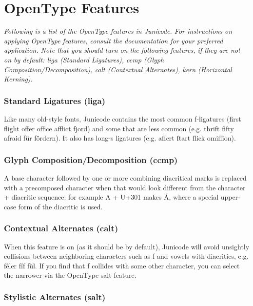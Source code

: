 \documentclass[12pt,a4paper,openany]{book}
\newcommand{\saltb}[1]{{\addfontfeatures{Alternate=1}{#1}}}
\begin{document}
\chapter*{\color{myBlue}OpenType Features}

{\itshape Following is a list of the OpenType features in
  Junicode. For instructions on applying OpenType features, consult
  the documentation for your preferred application. Note that you
  should turn on the following features, if they are not on by
  default: {\upshape liga} (Standard Ligatures), {\upshape ccmp}
  (Glyph Composition/Decomposition), {\upshape calt} (Contextual
  Alternates), {\upshape kern} (Horizontal Kerning).}

\subsection*{Standard Ligatures (liga)}

Like many old-style fonts, Junicode contains the most common f-ligatures
(first flight offer office afflict fjord) and some that are less common
(e.g. thrift fifty afraid für fördern).  It
also has long-s ligatures (e.g. aſſert ſtart ſlick omiſſion).

\subsection*{Glyph Composition/Decomposition (ccmp)}

A base character followed by one or more combining diacritical marks
is replaced with a precomposed character when that would look
different from the character + diacritic sequence: for example A +
U+301 makes Á, where a special upper-case form of the diacritic is
used.

\subsection*{Contextual Alternates (calt)}

When this feature is on (as it should be by default), Junicode will
avoid unsightly collisions between neighboring characters such as f
and vowels with diacritics, e.g.  fêler fíf fŭl. If you find that f
collides with some other character, you can select the narrower
\saltb{f} via the OpenType salt feature.

\subsection*{Stylistic Alternates (salt)}
\end{document}
